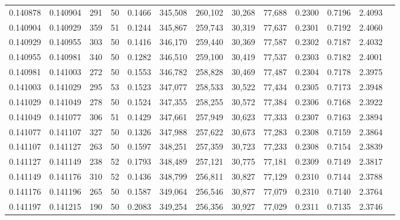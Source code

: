 \begin{tabular}{rrrrrrrrrrrrr}
0.140878 & 0.140904 &   291 &  50 &                                     0.1466 & 345,508 & 260,102 &  30,268 &  77,688 & 0.2300 & 0.7196 & 2.4093 \\
0.140904 & 0.140929 &   359 &  51 &                                     0.1244 & 345,867 & 259,743 &  30,319 &  77,637 & 0.2301 & 0.7192 & 2.4060 \\
0.140929 & 0.140955 &   303 &  50 &                                     0.1416 & 346,170 & 259,440 &  30,369 &  77,587 & 0.2302 & 0.7187 & 2.4032 \\
0.140955 & 0.140981 &   340 &  50 &                                     0.1282 & 346,510 & 259,100 &  30,419 &  77,537 & 0.2303 & 0.7182 & 2.4001 \\
0.140981 & 0.141003 &   272 &  50 &                                     0.1553 & 346,782 & 258,828 &  30,469 &  77,487 & 0.2304 & 0.7178 & 2.3975 \\
0.141003 & 0.141029 &   295 &  53 &                                     0.1523 & 347,077 & 258,533 &  30,522 &  77,434 & 0.2305 & 0.7173 & 2.3948 \\
0.141029 & 0.141049 &   278 &  50 &                                     0.1524 & 347,355 & 258,255 &  30,572 &  77,384 & 0.2306 & 0.7168 & 2.3922 \\
0.141049 & 0.141077 &   306 &  51 &                                     0.1429 & 347,661 & 257,949 &  30,623 &  77,333 & 0.2307 & 0.7163 & 2.3894 \\
0.141077 & 0.141107 &   327 &  50 &                                     0.1326 & 347,988 & 257,622 &  30,673 &  77,283 & 0.2308 & 0.7159 & 2.3864 \\
0.141107 & 0.141127 &   263 &  50 &                                     0.1597 & 348,251 & 257,359 &  30,723 &  77,233 & 0.2308 & 0.7154 & 2.3839 \\
0.141127 & 0.141149 &   238 &  52 &                                     0.1793 & 348,489 & 257,121 &  30,775 &  77,181 & 0.2309 & 0.7149 & 2.3817 \\
0.141149 & 0.141176 &   310 &  52 &                                     0.1436 & 348,799 & 256,811 &  30,827 &  77,129 & 0.2310 & 0.7144 & 2.3788 \\
0.141176 & 0.141196 &   265 &  50 &                                     0.1587 & 349,064 & 256,546 &  30,877 &  77,079 & 0.2310 & 0.7140 & 2.3764 \\
0.141197 & 0.141215 &   190 &  50 &                                     0.2083 & 349,254 & 256,356 &  30,927 &  77,029 & 0.2311 & 0.7135 & 2.3746 \\

\end{tabular}
